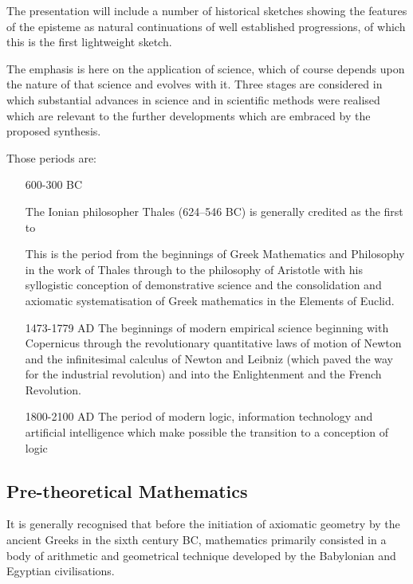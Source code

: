\documentclass[10pt,titlepage]{book}
\begin{document}
The presentation will include a number of historical sketches showing the features of the  episteme as natural continuations of well established progressions, of which this is the first lightweight sketch.

The emphasis is here on the application of science, which of course depends upon the nature of that science and evolves with it.
Three stages are considered in which substantial advances in science and in scientific methods were realised which are relevant to the further developments which are embraced by the proposed synthesis.

Those periods are:


\begin{itemize}

\item[600-300 BC]

  The Ionian philosopher Thales (624–546 BC) is generally credited as the first to 

  This is the period from the beginnings of Greek Mathematics and Philosophy in the work of Thales through to the philosophy of Aristotle with his syllogistic conception of demonstrative science and the consolidation and axiomatic systematisation of Greek mathematics in the Elements of Euclid.

\item[1473-1779 AD] The beginnings of modern empirical science beginning with Copernicus through the revolutionary quantitative laws of motion of Newton and the infinitesimal calculus of Newton and Leibniz (which paved the way for the industrial revolution) and into the Enlightenment and the French Revolution.

\item[1800-2100 AD] The period of modern logic, information technology and artificial intelligence which make possible the transition to a conception of logic

\end{itemize}



\subsection{Pre-theoretical Mathematics}

It is generally recognised that before the initiation of axiomatic geometry by the ancient Greeks in the sixth century BC, mathematics primarily consisted in a body of arithmetic and geometrical technique developed by the Babylonian and Egyptian civilisations.
\end{document}
